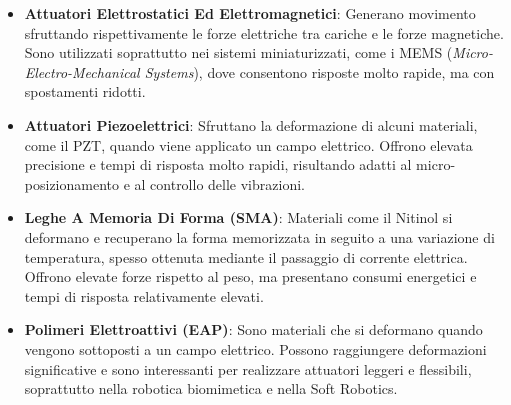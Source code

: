 ﻿\documentclass[11pt, a4paper]{article}
\begin{document}
\begin{itemize}
    \item \textbf{Attuatori Elettrostatici Ed Elettromagnetici}: Generano movimento sfruttando rispettivamente le forze elettriche tra cariche e le forze magnetiche. Sono utilizzati soprattutto nei sistemi miniaturizzati, come i MEMS (\textit{Micro-Electro-Mechanical Systems}), dove consentono risposte molto rapide, ma con spostamenti ridotti.

    \item \textbf{Attuatori Piezoelettrici}: Sfruttano la deformazione di alcuni materiali, come il PZT, quando viene applicato un campo elettrico. Offrono elevata precisione e tempi di risposta molto rapidi, risultando adatti al micro-posizionamento e al controllo delle vibrazioni.

    \item \textbf{Leghe A Memoria Di Forma (SMA)}: Materiali come il Nitinol si deformano e recuperano la forma memorizzata in seguito a una variazione di temperatura, spesso ottenuta mediante il passaggio di corrente elettrica. Offrono elevate forze rispetto al peso, ma presentano consumi energetici e tempi di risposta relativamente elevati.

    \item \textbf{Polimeri Elettroattivi (EAP)}: Sono materiali che si deformano quando vengono sottoposti a un campo elettrico. Possono raggiungere deformazioni significative e sono interessanti per realizzare attuatori leggeri e flessibili, soprattutto nella robotica biomimetica e nella Soft Robotics.
\end{itemize}
\end{document}
